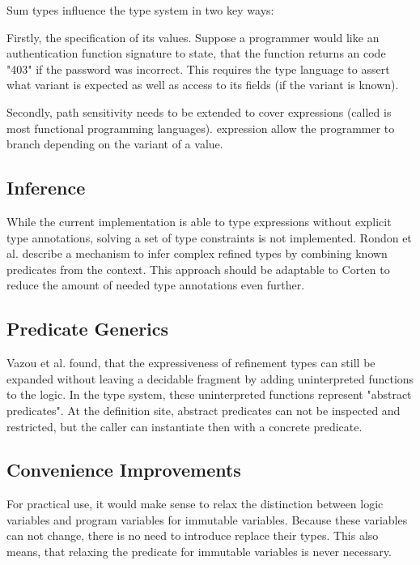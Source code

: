\documentclass[twoside, english]{sdqthesis}
\theoremstyle{definition}
\begin{document}
Sum types influence the type system in two key ways: 

Firstly, the specification of its values. Suppose a programmer would like an authentication function signature to state, that the function returns an  code "403" if the password was incorrect. This requires the type language to assert what variant is expected as well as access to its fields (if the variant is known).

Secondly, path sensitivity needs to be extended to cover  expressions (called  is most functional programming languages).  expression allow the programmer to branch depending on the variant of a value.

\subsection{Inference}

While the current implementation is able to type expressions without explicit type annotations, solving a set of type constraints is not implemented. 
Rondon et al. \cite{rondon_liquid_2008} describe a mechanism to infer complex refined types by combining known predicates from the context. This approach should be adaptable to Corten to reduce the amount of needed type annotations even further.


\subsection{Predicate Generics}

Vazou et al. \cite{vazou_abstract_2013} found, that the expressiveness of refinement types can still be expanded without leaving a decidable fragment by adding uninterpreted functions to the logic. In the type system, these uninterpreted functions represent "abstract predicates". At the definition site, abstract predicates can not be inspected and restricted, but the caller can instantiate then with a concrete predicate.

\subsection{Convenience Improvements}

For practical use, it would make sense to relax the distinction between logic variables and program variables for immutable variables. Because these variables can not change, there is no need to introduce replace their types. This also means, that relaxing the predicate for immutable variables is never necessary.
\end{document}
